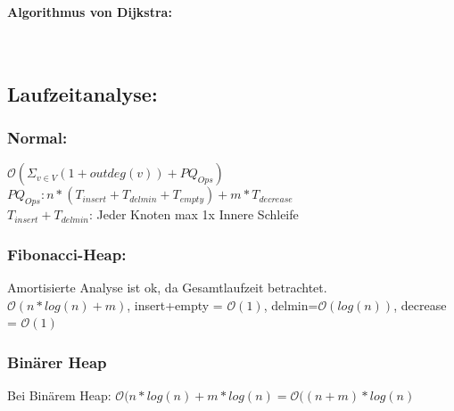 \documentclass[10pt,a4paper]{article}
\begin{document}
\paragraph{Algorithmus von Dijkstra:}~\\
\begin{algorithm}[H]
	
\end{algorithm}

\subsection*{Laufzeitanalyse:}
\subsubsection*{Normal:}
$\mathcal{O}(\Sigma_{v\in V}(1+outdeg(v))+PQ_{Ops})$\\ 
$PQ_{Ops}: n*(T_{insert}+T_{delmin}+T_{empty})+m*T_{decrease}$\\ 
$T_{insert} + T_{delmin}$: Jeder Knoten max 1x Innere Schleife
	
\subsubsection*{Fibonacci-Heap:}
Amortisierte Analyse ist ok, da Gesamtlaufzeit betrachtet.\\ $\mathcal{O}(n*log(n)+m)$, insert+empty = $\mathcal{O}(1)$, delmin=$\mathcal{O}(log(n))$, decrease = $\mathcal{O}(1)$

\subsubsection*{Binärer Heap}
Bei Binärem Heap: $\mathcal{O}(n*log(n)+m*log(n)=\mathcal{O}((n+m)*log(n)$
\end{document}
